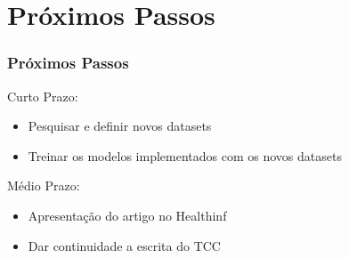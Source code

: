\documentclass[aspectratio=169]{beamer}
\begin{document}




\section{Próximos Passos}

\begin{frame}
    \frametitle{Próximos Passos}

    \begin{block}{Curto Prazo:}

        \begin{itemize}
            \item Pesquisar e definir novos datasets
            \item Treinar os modelos implementados com os novos datasets
        \end{itemize}

    \end{block}



    \begin{block}{Médio Prazo:}

        \begin{itemize}
            \item Apresentação do artigo no Healthinf
            \item Dar continuidade a escrita do TCC
        \end{itemize}

    \end{block}




\end{frame}


\end{document}
